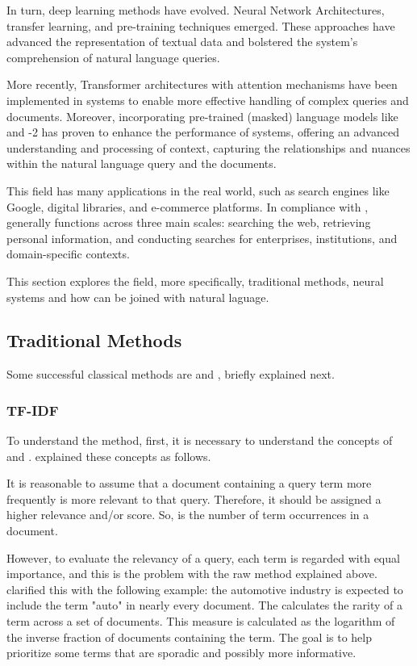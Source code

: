 In turn, deep learning methods have evolved. Neural Network Architectures, transfer learning, and pre-training techniques emerged. These approaches have advanced the representation of textual data and bolstered the {\ir} system's comprehension of natural language queries.

More recently, Transformer architectures with attention mechanisms have been implemented in {\ir} systems to enable more effective handling of complex queries and documents. Moreover, incorporating pre-trained (masked) language models like {\bert} \cite{devlin_bert_2018} and {\gpt}-2 has proven to enhance the performance of {\ir} systems, offering an advanced understanding and processing of context, capturing the relationships and nuances within the natural language query and the documents.

This field has many applications in the real world, such as search engines like Google, digital libraries, and e-commerce platforms. In compliance with \citet{p_m_efficient_2021}, {\ir} generally functions across three main scales: searching the web, retrieving personal information, and conducting searches for enterprises, institutions, and domain-specific contexts.

This section explores the {\ir} field, more specifically, traditional methods, neural {\ir} systems and how {\ir} can be joined with natural laguage.


\subsection{Traditional Methods}

Some successful classical methods are {\tfidf} and {\bm}, briefly explained next.

\subsubsection{TF-IDF}

To understand the {\tfidf} method, first, it is necessary to understand the concepts of {\tf} and {\idf}. \citet{manning_introduction_2009} explained these concepts as follows.

It is reasonable to assume that a document containing a query term more frequently is more relevant to that query. Therefore, it should be assigned a higher relevance and/or score. So, {\tf} is the number of term occurrences in a document.

However, to evaluate the relevancy of a query, each term is regarded with equal importance, and this is the problem with the raw method explained above. \citet{manning_introduction_2009} clarified this with the following example: the automotive industry is expected to include the term "auto" in nearly every document. The  {\idf} calculates the rarity of a term across a set of documents. This measure is calculated as the logarithm of the inverse fraction of documents containing the term. The goal is to help prioritize some terms that are sporadic and possibly more informative.

